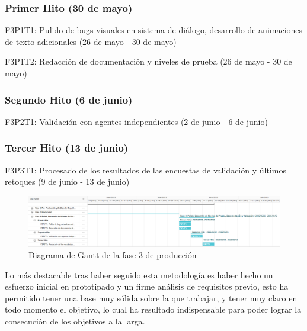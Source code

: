 \subsubsection{Primer Hito (30 de mayo)}

\begin{compactitem}
\item F3P1T1: Pulido de bugs visuales en sistema de diálogo, desarrollo de animaciones de texto adicionales (26 de mayo - 30 de mayo)
\item F3P1T2: Redacción de documentación y niveles de prueba (26 de mayo - 30 de mayo)
\end{compactitem}

\subsubsection{Segundo Hito (6 de junio)}

\begin{compactitem}
\item F3P2T1: Validación con agentes independientes (2 de junio - 6 de junio)
\end{compactitem}

\subsubsection{Tercer Hito (13 de junio)}

\begin{compactitem}
  \item F3P3T1: Procesado de los resultados de las encuestas de validación y últimos retoques (9 de junio - 13 de junio)
\end{compactitem}

\begin{figure}[H]
  \centering
	\includegraphics[width=450px,clip=true]{gant3.png}
  \caption{Diagrama de Gantt de la fase 3 de producción}
  \label{fig:fase3gantt}
\end{figure}

Lo más destacable tras haber seguido esta metodología es haber hecho un esfuerzo inicial en prototipado y un firme análisis de requisitos 
previo, esto ha permitido tener una base muy sólida sobre la que trabajar, y tener muy claro en todo momento el objetivo, lo cual ha resultado indispensable 
para poder lograr la consecución de los objetivos a la larga.